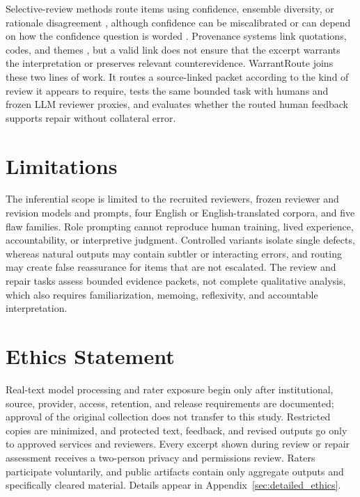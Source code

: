 Selective-review methods route items using confidence, ensemble diversity, or rationale disagreement \citep{zhao2025confidence,tajik2026disagreement}, although confidence can be miscalibrated or can depend on how the confidence question is worded \citep{li2026confidence}. Provenance systems link quotations, codes, and themes \citep{ye2026reflexis,yi2026provenance}, but a valid link does not ensure that the excerpt warrants the interpretation or preserves relevant counterevidence. WarrantRoute joins these two lines of work. It routes a source-linked packet according to the kind of review it appears to require, tests the same bounded task with humans and frozen LLM reviewer proxies, and evaluates whether the routed human feedback supports repair without collateral error.

\section{Limitations}

The inferential scope is limited to the recruited reviewers, frozen reviewer and revision models and prompts, four English or English-translated corpora, and five flaw families. Role prompting cannot reproduce human training, lived experience, accountability, or interpretive judgment. Controlled variants isolate single defects, whereas natural outputs may contain subtler or interacting errors, and routing may create false reassurance for items that are not escalated. The review and repair tasks assess bounded evidence packets, not complete qualitative analysis, which also requires familiarization, memoing, reflexivity, and accountable interpretation.

\section{Ethics Statement}

Real-text model processing and rater exposure begin only after institutional, source, provider, access, retention, and release requirements are documented; approval of the original collection does not transfer to this study. Restricted copies are minimized, and protected text, feedback, and revised outputs go only to approved services and reviewers. Every excerpt shown during review or repair assessment receives a two-person privacy and permissions review. Raters participate voluntarily, and public artifacts contain only aggregate outputs and specifically cleared material. Details appear in Appendix~\ref{sec:detailed_ethics}.

